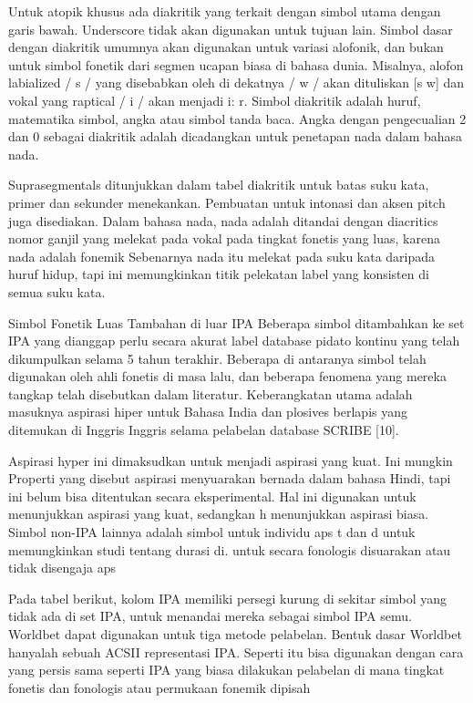 	Untuk atopik khusus ada diakritik yang terkait dengan simbol utama dengan garis bawah.
	Underscore tidak akan digunakan untuk tujuan lain. Simbol dasar dengan diakritik umumnya akan digunakan untuk variasi alofonik, dan bukan untuk simbol fonetik dari segmen ucapan biasa di bahasa dunia. Misalnya, alofon labialized / s / yang disebabkan oleh di dekatnya / w / akan dituliskan [s w] dan vokal yang raptical / i / akan menjadi i: r. Simbol diakritik adalah huruf, matematika simbol, angka atau simbol tanda baca. Angka dengan pengecualian 2 dan 0 sebagai diakritik adalah dicadangkan untuk penetapan nada dalam bahasa nada.

	Suprasegmentals ditunjukkan dalam tabel diakritik untuk batas suku kata, primer dan sekunder
    menekankan. Pembuatan untuk intonasi dan aksen pitch juga disediakan. Dalam bahasa nada, nada adalah
    ditandai dengan diacritics nomor ganjil yang melekat pada vokal pada tingkat fonetis yang luas, karena nada
    adalah fonemik Sebenarnya nada itu melekat pada suku kata daripada huruf hidup, tapi ini
    memungkinkan titik pelekatan label yang konsisten di semua suku kata.

	Simbol Fonetik Luas Tambahan di luar IPA 
	Beberapa simbol ditambahkan ke set IPA yang dianggap perlu secara akurat
	label database pidato kontinu yang telah dikumpulkan selama 5 tahun terakhir. Beberapa di antaranya
	simbol telah digunakan oleh ahli fonetis di masa lalu, dan beberapa fenomena yang mereka tangkap
	telah disebutkan dalam literatur. Keberangkatan utama adalah masuknya aspirasi hiper untuk
	Bahasa India dan plosives berlapis yang ditemukan di Inggris Inggris selama pelabelan
	database SCRIBE [10]. 

    Aspirasi hyper ini dimaksudkan untuk menjadi aspirasi yang kuat. Ini mungkin
	Properti yang disebut aspirasi menyuarakan bernada dalam bahasa Hindi, tapi ini belum bisa ditentukan secara eksperimental.
	Hal ini digunakan untuk menunjukkan aspirasi yang kuat, sedangkan h menunjukkan aspirasi biasa. Simbol non-IPA lainnya
	adalah simbol untuk individu
	aps t dan d untuk memungkinkan studi tentang durasi di. untuk
	secara fonologis disuarakan atau tidak disengaja
	aps

	Pada tabel berikut, kolom IPA memiliki persegi
	kurung di sekitar simbol yang tidak ada di set IPA, untuk menandai mereka sebagai simbol IPA semu.
	Worldbet dapat digunakan untuk tiga metode pelabelan. Bentuk dasar Worldbet hanyalah sebuah ACSII
	representasi IPA. Seperti itu bisa digunakan dengan cara yang persis sama seperti IPA yang biasa dilakukan
	pelabelan di mana tingkat fonetis dan fonologis atau permukaan fonemik dipisah

